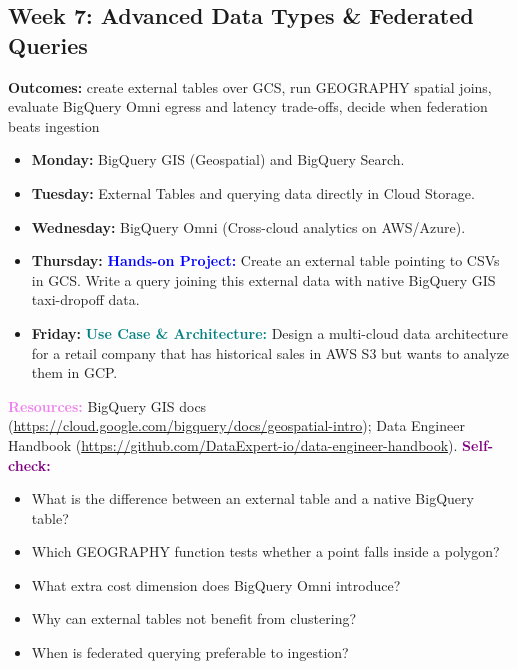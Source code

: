 \documentclass[11pt, a4paper]{article}
\newcommand{\project}[1]{\vspace{1mm}\noindent\textbf{\textcolor{blue}{Hands-on Project:}} #1}
\newcommand{\usecase}[1]{\vspace{1mm}\noindent\textbf{\textcolor{teal}{Use Case \& Architecture:}} #1}
\newcommand{\dayitem}[2]{\item \textbf{#1:} #2}
\newcommand{\resources}[1]{\vspace{1mm}\noindent\textbf{\textcolor{violet}{Resources:}} #1}
\newcommand{\selfcheck}[1]{\vspace{1mm}\noindent\textbf{\textcolor{purple}{Self-check:}} #1}
\begin{document}
\subsection*{Week 7: Advanced Data Types \& Federated Queries}
\par\noindent\textbf{Outcomes:} create external tables over GCS, run GEOGRAPHY spatial joins, evaluate BigQuery Omni egress and latency trade-offs, decide when federation beats ingestion
\begin{itemize}[label=-]
    \dayitem{Monday}{BigQuery GIS (Geospatial) and BigQuery Search.}
    \dayitem{Tuesday}{External Tables and querying data directly in Cloud Storage.}
    \dayitem{Wednesday}{BigQuery Omni (Cross-cloud analytics on AWS/Azure).}
    \dayitem{Thursday}{\project{Create an external table pointing to CSVs in GCS. Write a query joining this external data with native BigQuery GIS taxi-dropoff data.}}
    \dayitem{Friday}{\usecase{Design a multi-cloud data architecture for a retail company that has historical sales in AWS S3 but wants to analyze them in GCP.}}
\end{itemize}
\resources{BigQuery GIS docs (\url{https://cloud.google.com/bigquery/docs/geospatial-intro}); Data Engineer Handbook (\url{https://github.com/DataExpert-io/data-engineer-handbook}).}
\selfcheck{\begin{itemize}[label=-, nosep, leftmargin=1.5em]
    \item What is the difference between an external table and a native BigQuery table?
    \item Which GEOGRAPHY function tests whether a point falls inside a polygon?
    \item What extra cost dimension does BigQuery Omni introduce?
    \item Why can external tables not benefit from clustering?
    \item When is federated querying preferable to ingestion?
\end{itemize}}
\end{document}
